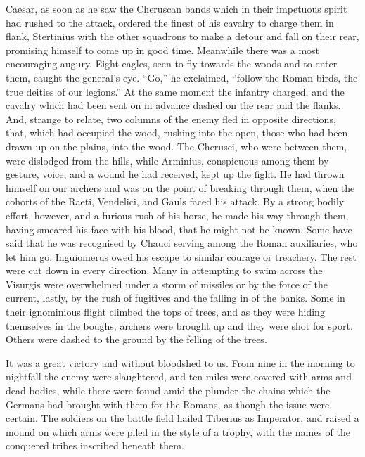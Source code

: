 Caesar, as soon as he saw the Cheruscan bands which in their impetuous spirit had rushed to the attack, ordered the finest of his cavalry to charge them in flank, Stertinius with the other squadrons to make a detour and fall on their rear, promising himself to come up in good time. Meanwhile there was a most encouraging augury. Eight eagles, seen to fly towards the woods and to enter them, caught the general's eye. ``Go,'' he exclaimed, ``follow the Roman birds, the true deities of our legions.'' At the same moment the infantry charged, and the cavalry which had been sent on in advance dashed on the rear and the flanks. And, strange to relate, two columns of the enemy fled in opposite directions, that, which had occupied the wood, rushing into the open, those who had been drawn up on the plains, into the wood. The Cherusci, who were between them, were dislodged from the hills, while Arminius, conspicuous among them by gesture, voice, and a wound he had received, kept up the fight. He had thrown himself on our archers and was on the point of breaking through them, when the cohorts of the Raeti, Vendelici, and Gauls faced his attack. By a strong bodily effort, however, and a furious rush of his horse, he made his way through them, having smeared his face with his blood, that he might not be known. Some have said that he was recognised by Chauci serving among the Roman auxiliaries, who let him go. Inguiomerus owed his escape to similar courage or treachery. The rest were cut down in every direction. Many in attempting to swim across the Visurgis were overwhelmed under a storm of missiles or by the force of the current, lastly, by the rush of fugitives and the falling in of the banks. Some in their ignominious flight climbed the tops of trees, and as they were hiding themselves in the boughs, archers were brought up and they were shot for sport. Others were dashed to the ground by the felling of the trees.


It was a great victory and without bloodshed to us. From nine in the morning to nightfall the enemy were slaughtered, and ten miles were covered with arms and dead bodies, while there were found amid the plunder the chains which the Germans had brought with them for the Romans, as though the issue were certain. The soldiers on the battle field hailed Tiberius as Imperator, and raised a mound on which arms were piled in the style of a trophy, with the names of the conquered tribes inscribed beneath them.



